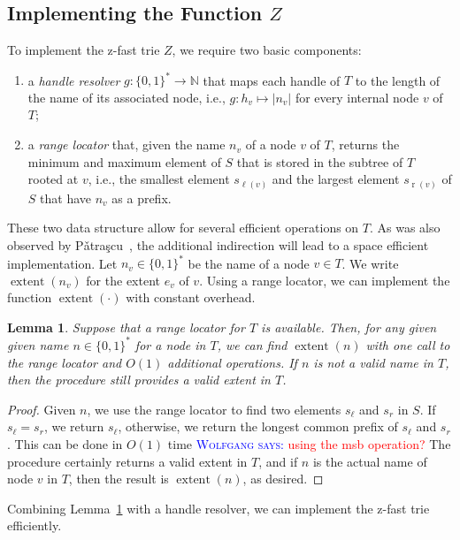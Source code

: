 \documentclass[a4paper,11pt]{article}
\newtheorem{lemma}[theorem]{Lemma}
\newcommand{\N}{\mathbb{N}}
\newcommand{\?}{\mskip1.5mu}
\newcommand{\Patrascu}{P\v{a}tra\c{s}cu\xspace}
\DeclareMathOperator{\lrange}{\ell}
\DeclareMathOperator{\rrange}{r}
\DeclareMathOperator{\extent}{extent}
\newcommand{\aremark}[3]{\textcolor{blue}{\textsc{#1 #2:}}
  \textcolor{red}{\textsf{#3}}}
\newcommand{\wolfgang}[2][says]{\aremark{Wolfgang}{#1}{#2}}
\begin{document}
\subsection{Implementing the Function $Z$}

To implement the z-fast trie $Z$, we require two
basic components:
\begin{enumerate}
  \item a \emph{handle resolver} $g: \{0,1\}^* \rightarrow \N$ that 
    maps each handle of $T$ to the length of the name of its associated 
    node, i.e., $g: h_v \mapsto |n_v|$ for every internal node $v$ 
    of $T$;
  \item a \emph{range locator} that, given the 
  name $n_v$ of a node $v$ of $T$, returns the minimum and
  maximum element of $S$ that is stored in the subtree of $T$
  rooted at $v$, i.e., the smallest element $s_{\lrange(v)}$ and the 
  largest element $s_{\rrange(v)}$ of $S$ that
  have $n_v$ as a prefix.
\end{enumerate}

These two data structure allow for several efficient operations
on $T$. As was also observed by \Patrascu~\cite{Patrascu10}, the 
additional indirection will lead to a space efficient implementation.
Let $n_v \in \{0, 1\}^*$ be the name of a node $v \in T$. We 
write $\extent(n_v)$ for the extent $e_v$ of $v$. Using a range locator,
we can implement the function $\extent(\cdot)$ with constant overhead.

\begin{lemma}\label{lem:getextent}
Suppose that a range locator for $T$ is available. Then, for any
given given name $n \in \{0, 1\}^*$ for a node in $T$, we can
find $\extent(n)$ with one call to the range locator and $O(1)$
additional operations.  If $n$ is not a valid name in $T$, then
the procedure still provides a valid extent in $T$.
\end{lemma}

\begin{proof}
Given $n$, we use the range locator to find 
two elements $s_\ell$ and $s_r$ in $S$.
If $s_\ell = s_r$, we return $s_\ell$,
otherwise, we return the longest common prefix of 
$s_\ell$ and $s_r$. This can be done in
$O(1)$ time \wolfgang{using the msb operation?}
The procedure certainly returns a valid extent
in $T$, and if $n$ is the actual name of node
$v$ in $T$, then the result is $\extent(n)$, 
as desired.
\end{proof}

Combining Lemma~\ref{lem:getextent} with a handle resolver,
we can implement the z-fast trie efficiently.
\end{document}

